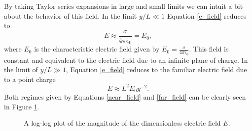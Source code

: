 \documentclass[12pt,a4paper,oneside]{book}
\begin{document}
By taking Taylor series expansions in large and small limits we can intuit a bit about the behavior of this field. In the limit $y/L \ll 1$ Equation \ref{e_field} reduces to
\begin{equation}
\label{near_field}
E \approx \frac{\sigma}{4 \pi \epsilon_0} = E_0,
\end{equation}
where $E_0$ is the characteristic electric field given by $E_0 = \frac{\sigma}{4 \pi \epsilon_0}$. This field is constant and equivalent to the electric field due to an infinite plane of charge. In the limit of $y/L \gg 1$, Equation \ref{e_field} reduces to the familiar electric field due to a point charge
\begin{equation}
\label{far_field}
E \approx L^2 E_0 y^{-2}.
\end{equation}
Both regimes given by Equations \ref{near_field} and \ref{far_field} can be clearly seen in Figure \ref{fig:E0}.
\begin{figure}[h]
    \centering
    \def\svgwidth{\columnwidth}
    
    \caption{A log-log plot of the magnitude of the dimensionless electric field $E$.\label{fig:E0}}
\end{figure}
\newpage
\end{document}
